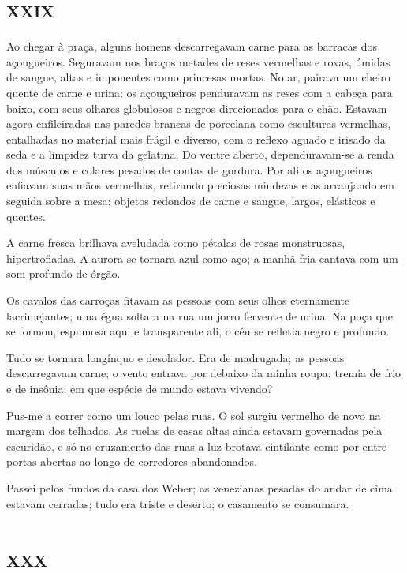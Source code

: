 \chapter*{\huge\centering\textsc{xxix}}

Ao chegar à praça, alguns homens descarregavam carne para as barracas dos açougueiros. Seguravam nos braços metades de reses vermelhas e roxas, úmidas de sangue, altas e imponentes como princesas mortas. No ar, pairava um cheiro quente de carne e urina; os açougueiros penduravam as reses com a cabeça para baixo, com seus olhares globulosos e negros direcionados para o chão. Estavam agora enfileiradas nas paredes brancas de porcelana como esculturas vermelhas, entalhadas no material mais frágil e diverso, com o reflexo aguado e irisado da seda e a limpidez turva da gelatina. Do ventre aberto, dependuravam-se a renda dos músculos e colares pesados de contas de gordura. Por ali os açougueiros enfiavam suas mãos vermelhas, retirando preciosas miudezas e as arranjando em seguida sobre a mesa: objetos redondos de carne e sangue, largos, elásticos e quentes.

A carne fresca brilhava aveludada como pétalas de rosas monstruosas, hipertrofiadas. A aurora se tornara azul como aço; a manhã fria cantava com um som profundo de órgão.

Os cavalos das carroças fitavam as pessoas com seus olhos eternamente lacrimejantes; uma égua soltara na rua um jorro fervente de urina. Na poça que se formou, espumosa aqui e transparente ali, o céu se refletia negro e profundo.

Tudo se tornara longínquo e desolador. Era de madrugada; as pessoas descarregavam carne; o vento entrava por debaixo da minha roupa; tremia de frio e de insônia; em que espécie de mundo estava vivendo? 

Pus-me a correr como um louco pelas ruas. O sol surgiu vermelho de novo na margem dos telhados. As ruelas de casas altas ainda estavam governadas pela escuridão, e só no cruzamento das ruas a luz brotava cintilante como por entre portas abertas ao longo de corredores abandonados.

Passei pelos fundos da casa dos Weber; as venezianas pesadas do andar de cima estavam cerradas; tudo era triste e deserto; o casamento se consumara.


\chapter*{\huge\centering\textsc{xxx}}

